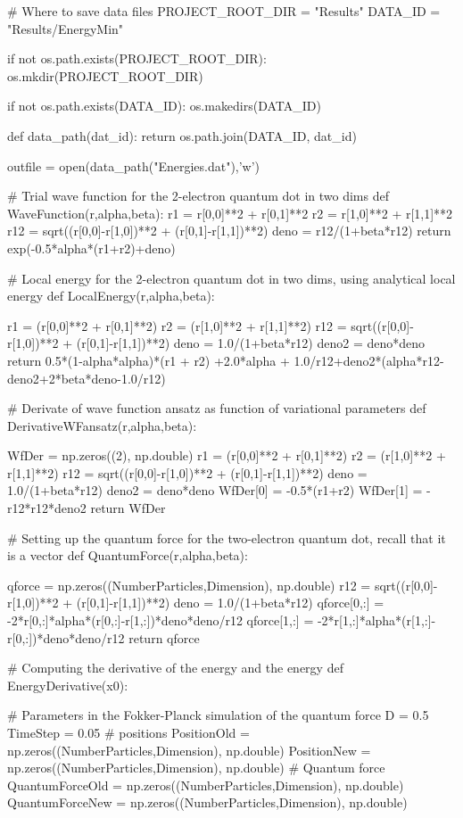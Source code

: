 \documentclass[%
oneside,                 %
final,                   %
10pt]{article}
\begin{document}
# Where to save data files
PROJECT_ROOT_DIR = "Results"
DATA_ID = "Results/EnergyMin"

if not os.path.exists(PROJECT_ROOT_DIR):
    os.mkdir(PROJECT_ROOT_DIR)

if not os.path.exists(DATA_ID):
    os.makedirs(DATA_ID)

def data_path(dat_id):
    return os.path.join(DATA_ID, dat_id)

outfile = open(data_path("Energies.dat"),'w')


# Trial wave function for the 2-electron quantum dot in two dims
def WaveFunction(r,alpha,beta):
    r1 = r[0,0]**2 + r[0,1]**2
    r2 = r[1,0]**2 + r[1,1]**2
    r12 = sqrt((r[0,0]-r[1,0])**2 + (r[0,1]-r[1,1])**2)
    deno = r12/(1+beta*r12)
    return exp(-0.5*alpha*(r1+r2)+deno)

# Local energy  for the 2-electron quantum dot in two dims, using analytical local energy
def LocalEnergy(r,alpha,beta):
    
    r1 = (r[0,0]**2 + r[0,1]**2)
    r2 = (r[1,0]**2 + r[1,1]**2)
    r12 = sqrt((r[0,0]-r[1,0])**2 + (r[0,1]-r[1,1])**2)
    deno = 1.0/(1+beta*r12)
    deno2 = deno*deno
    return 0.5*(1-alpha*alpha)*(r1 + r2) +2.0*alpha + 1.0/r12+deno2*(alpha*r12-deno2+2*beta*deno-1.0/r12)

# Derivate of wave function ansatz as function of variational parameters
def DerivativeWFansatz(r,alpha,beta):
    
    WfDer  = np.zeros((2), np.double)
    r1 = (r[0,0]**2 + r[0,1]**2)
    r2 = (r[1,0]**2 + r[1,1]**2)
    r12 = sqrt((r[0,0]-r[1,0])**2 + (r[0,1]-r[1,1])**2)
    deno = 1.0/(1+beta*r12)
    deno2 = deno*deno
    WfDer[0] = -0.5*(r1+r2)
    WfDer[1] = -r12*r12*deno2
    return  WfDer

# Setting up the quantum force for the two-electron quantum dot, recall that it is a vector
def QuantumForce(r,alpha,beta):

    qforce = np.zeros((NumberParticles,Dimension), np.double)
    r12 = sqrt((r[0,0]-r[1,0])**2 + (r[0,1]-r[1,1])**2)
    deno = 1.0/(1+beta*r12)
    qforce[0,:] = -2*r[0,:]*alpha*(r[0,:]-r[1,:])*deno*deno/r12
    qforce[1,:] = -2*r[1,:]*alpha*(r[1,:]-r[0,:])*deno*deno/r12
    return qforce
    

# Computing the derivative of the energy and the energy 
def EnergyDerivative(x0):

    
    # Parameters in the Fokker-Planck simulation of the quantum force
    D = 0.5
    TimeStep = 0.05
    # positions
    PositionOld = np.zeros((NumberParticles,Dimension), np.double)
    PositionNew = np.zeros((NumberParticles,Dimension), np.double)
    # Quantum force
    QuantumForceOld = np.zeros((NumberParticles,Dimension), np.double)
    QuantumForceNew = np.zeros((NumberParticles,Dimension), np.double)
\end{document}
